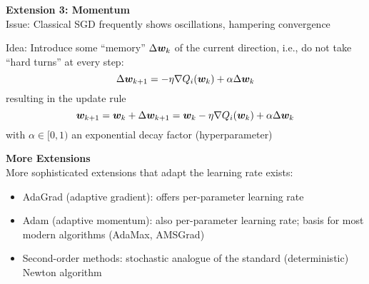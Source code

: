 
\begin{frame}
    \vspace*{5mm}
    \textbf{Extension 3: Momentum}\\

    Issue: Classical SGD frequently shows oscillations, hampering convergence

    Idea: Introduce some ``memory'' $\Delta \bm{w}_k$ of the current direction, i.e., do not take
    ``hard turns'' at every step:
    $$\Delta \bm{w}_{k + 1} = -\eta \nabla Q_i(\bm{w}_k) + \alpha \Delta \bm{w}_k $$
    resulting in the update rule
    $$\bm{w}_{k+1} =  \bm{w}_k + \Delta \bm{w}_{k + 1} = \bm{w}_k - \eta \nabla Q_i(\bm{w}_k) + \alpha \Delta \bm{w}_k $$
    with $\alpha \in [0, 1)$ an exponential decay factor (hyperparameter)
\end{frame}

\begin{frame}
    \vspace*{5mm}
    \textbf{More Extensions}\\

    More sophisticated extensions that adapt the learning rate exists:
    \begin{itemize}
        \item AdaGrad (adaptive gradient): offers per-parameter learning rate
        \item Adam (adaptive momentum): also per-parameter learning rate; basis for most modern algorithms (AdaMax, AMSGrad)
        \item Second-order methods: stochastic analogue of the standard (deterministic) Newton algorithm
    \end{itemize}

\end{frame}

